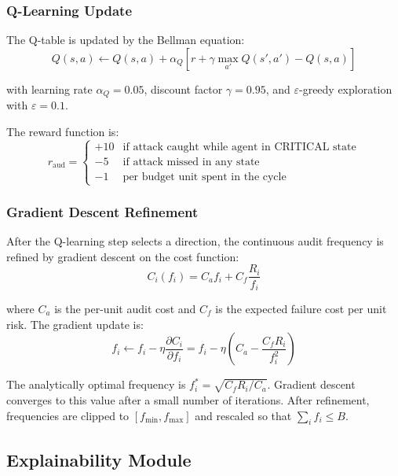 \subsubsection{Q-Learning Update}

The Q-table is updated by the Bellman equation:
\begin{equation}
Q(s,a) \leftarrow Q(s,a) + \alpha_Q \left[ r + \gamma \max_{a'} Q(s',a') - Q(s,a) \right]
\label{eq:bellman}
\end{equation}

with learning rate $\alpha_Q = 0.05$, discount factor $\gamma = 0.95$, and $\varepsilon$-greedy
exploration with $\varepsilon = 0.1$.

The reward function is:
\begin{equation}
r_{\text{aud}} = \begin{cases}
+10 & \text{if attack caught while agent in CRITICAL state} \\
-5  & \text{if attack missed in any state} \\
-1  & \text{per budget unit spent in the cycle}
\end{cases}
\label{eq:reward}
\end{equation}

\subsubsection{Gradient Descent Refinement}

After the Q-learning step selects a direction, the continuous audit frequency is refined by
gradient descent on the cost function:
\begin{equation}
C_i(f_i) = C_a f_i + C_f \frac{R_i}{f_i}
\end{equation}

where $C_a$ is the per-unit audit cost and $C_f$ is the expected failure cost per unit risk. The
gradient update is:
\begin{equation}
f_i \leftarrow f_i - \eta \frac{\partial C_i}{\partial f_i} =
f_i - \eta \left( C_a - \frac{C_f R_i}{f_i^2} \right)
\label{eq:gradupdate}
\end{equation}

The analytically optimal frequency is $f_i^* = \sqrt{C_f R_i / C_a}$. Gradient descent
converges to this value after a small number of iterations. After refinement, frequencies are
clipped to $[f_{\min}, f_{\max}]$ and rescaled so that $\sum_i f_i \leq B$.

\subsection{Explainability Module}
\label{sec:xai}

